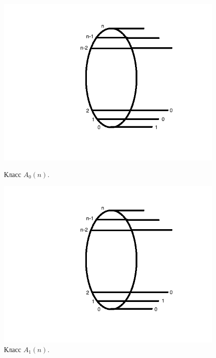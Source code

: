 \documentclass[oneside, final, 14pt]{extreport}
\begin{document}
 \begin{figure}[h]
 	\begin{center}
 		\begin{minipage}[h]{0.3\linewidth}
 			\includegraphics[width=1\linewidth]{A0}
 			\caption{Класс $A_0(n)$.} %
 			\label{ris:A0} %
 		\end{minipage}
 		\hfill 
 		\begin{minipage}[h]{0.3\linewidth}
 			\includegraphics[width=1\linewidth]{A1}
 			\caption{Класс $A_1(n)$.}
 			\label{ris:A1}
 		\end{minipage}
 		\hfill 
 		\begin{minipage}[h]{0.3\linewidth}

\end{minipage}
\end{center}
\end{figure}
\end{document}
